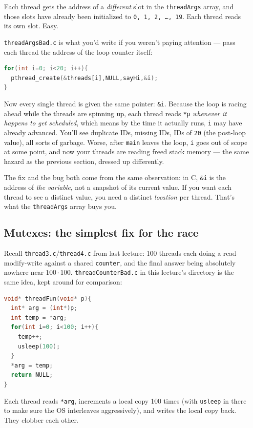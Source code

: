 \documentclass[11pt]{article}
\begin{document}
Each thread gets the address of a \emph{different} slot in the
\texttt{threadArgs} array, and those slots have already been
initialized to \texttt{0, 1, 2, \dots, 19}. Each thread reads its own
slot. Easy.

\texttt{threadArgsBad.c} is what you'd write if you weren't paying
attention --- pass each thread the address of the loop counter
itself:

\begin{lstlisting}[language=C]
for(int i=0; i<20; i++){
  pthread_create(&threads[i],NULL,sayHi,&i);
}
\end{lstlisting}

Now every single thread is given the same pointer: \texttt{\&i}.
Because the loop is racing ahead while the threads are spinning up,
each thread reads \texttt{*p} \emph{whenever it happens to get
scheduled}, which means by the time it actually runs, \texttt{i} may
have already advanced. You'll see duplicate IDs, missing IDs, IDs of
\texttt{20} (the post-loop value), all sorts of garbage. Worse, after
\texttt{main} leaves the loop, \texttt{i} goes out of scope at some
point, and now your threads are reading freed stack memory --- the
same hazard as the previous section, dressed up differently.

The fix and the bug both come from the same observation: in C,
\texttt{\&i} is the address of \emph{the variable}, not a snapshot of
its current value. If you want each thread to see a distinct value,
you need a distinct \emph{location} per thread. That's what the
\texttt{threadArgs} array buys you.

\subsection*{Mutexes: the simplest fix for the race}

Recall \texttt{thread3.c}/\texttt{thread4.c} from last lecture: 100
threads each doing a read-modify-write against a shared
\texttt{counter}, and the final answer being absolutely nowhere near
\(100 \cdot 100\). \texttt{threadCounterBad.c} in this lecture's
directory is the same idea, kept around for comparison:

\begin{lstlisting}[language=C]
void* threadFun(void* p){
  int* arg = (int*)p;
  int temp = *arg;
  for(int i=0; i<100; i++){
    temp++;
    usleep(100);
  }
  *arg = temp;
  return NULL;
}
\end{lstlisting}

Each thread reads \texttt{*arg}, increments a local copy 100 times
(with \texttt{usleep} in there to make sure the OS interleaves
aggressively), and writes the local copy back. They clobber each
other.
\end{document}
